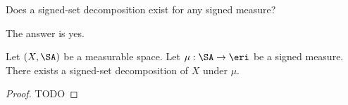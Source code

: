 
\sbasic



\sstart



Does a signed-set decomposition
exist for any signed measure?


The answer is yes.

\begin{prop}
Let $(X, \SA)$ be
a measurable space.
Let $\mu: \SA \to \eri$
be a signed measure.
There exists a signed-set
decomposition of $X$ under $\mu$.
  \begin{proof}
    TODO
  \end{proof}
\end{prop}


\strats
